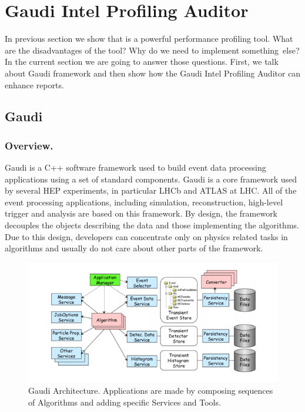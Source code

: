 \documentclass[a4paper]{jpconf}
\begin{document}
\section{Gaudi Intel Profiling Auditor}

In previous section we show that \iamp is a powerful performance profiling tool. What are the disadvantages of the tool? 
Why do we need to implement something~else? In the current section we are going to answer those questions. 
First, we talk about Gaudi framework and then show how the Gaudi Intel Profiling Auditor can enhance \amp reports.

\subsection{Gaudi}

\subsubsection{Overview.}

Gaudi is a C++ software framework used to build event data processing applications using a set of standard components.  
Gaudi is a core framework used by several HEP experiments, in particular LHCb and ATLAS at LHC. 
All of the event processing applications, including simulation, reconstruction, high-level trigger and analysis 
are based on this framework. By design, the framework decouples the objects  describing the data and those 
implementing the algorithms. Due to this design,  developers can concentrate only on  physics related tasks 
in algorithms and usually do not care about other parts of the framework. 

\begin{figure}[H]
\begin{minipage}{\textwidth}
\includegraphics[width=\textwidth]{figs/fig07.png}
\caption{\label{fig07}Gaudi Architecture. Applications are made by composing sequences of Algorithms and adding 
specific Services and Tools.}
\end{minipage}
\end{figure}
\end{document}

